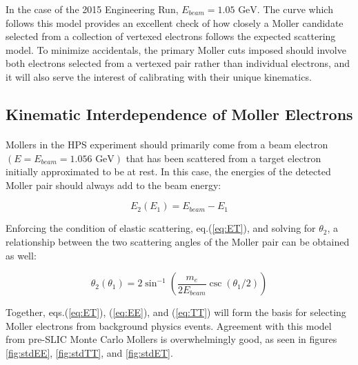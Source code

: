 \documentclass{article}
\begin{document}
	In the case of the 2015 Engineering Run, $E_{beam} = \mbox{1.05 GeV}$. The curve which follows this model provides an excellent check of how closely a Moller candidate selected from a collection of vertexed electrons follows the expected scattering model. 
	To minimize accidentals, the primary Moller cuts imposed should involve both electrons selected from a vertexed pair rather than individual electrons, and it will also serve the interest of calibrating with their unique kinematics.

\subsection{Kinematic Interdependence of Moller Electrons}
	\paragraph{}
	Mollers in the HPS experiment should primarily come from a beam electron $\left(E=E_{beam}=\mbox{1.056 GeV}\right)$ that has been scattered from a target electron initially approximated to be at rest. In this case, the energies of the detected Moller pair should always add to the beam energy:

	 \begin{equation} \label{eq:EE}
  	E_2(E_1) = E_{beam} - E_1
	\end{equation}

	Enforcing the condition of elastic scattering, eq.(\ref{eq:ET}), and solving for $\theta_2$, a relationship between the two scattering angles of the Moller pair can be obtained as well:
	
	 \begin{equation} \label{eq:TT}
  	\theta_2(\theta_1) = 2\sin^{-1}{\left(\frac{m_e}{2E_{beam}}\csc{\left(\theta_1/2\right)}\right)}
	\end{equation}

	Together, eqs.(\ref{eq:ET}), (\ref{eq:EE}), and (\ref{eq:TT}) will form the basis for selecting Moller electrons from background physics events. Agreement with this model from pre-SLIC Monte Carlo Mollers is overwhelmingly good, as seen in figures \ref{fig:stdEE}, \ref{fig:stdTT}, and \ref{fig:stdET}.
	
\end{document}
